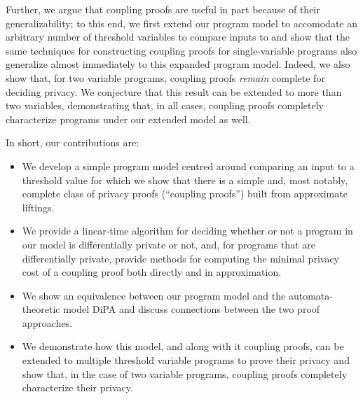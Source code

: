 Further, we argue that coupling proofs are useful in part because of their generalizability; to this end, we first extend our program model to accomodate an arbitrary number of threshold variables to compare inputs to and show that the same techniques for constructing coupling proofs for single-variable programs also generalize almost immediately to this expanded program model. 
Indeed, we also show that, for two variable programs, coupling proofs \textit{remain} complete for deciding privacy. We conjecture that this result can be extended to more than two variables, demonstrating that, in all cases, coupling proofs completely characterize programs under our extended model as well. 


In short, our contributions are:
\begin{itemize}
    \item We develop a simple program model centred around comparing an input to a threshold value for which we show that there is a simple and, most notably, complete class of privacy proofs (``coupling proofs'') built from approximate liftings.
    \item We provide a linear-time algorithm for deciding whether or not a program in our model is differentially private or not, and, for programs that are differentially private, provide methods for computing the minimal privacy cost of a coupling proof both directly and in approximation. 
    \item We show an equivalence between our program model and the automata-theoretic model DiPA \cite{chadhaLinearTimeDecidability2021} and discuss connections between the two proof approaches. 
    \item We demonstrate how this model, and along with it coupling proofs, can be extended to multiple threshold variable programs to prove their privacy and show that, in the case of two variable programs, coupling proofs completely characterize their privacy. 
\end{itemize}